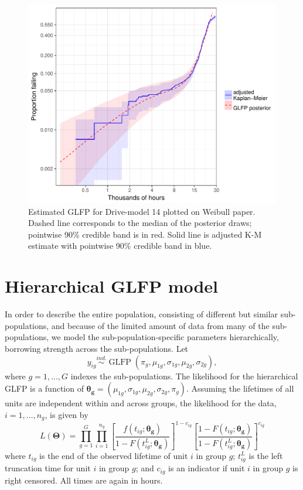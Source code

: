 \documentclass[aap]{imsart}
\newcommand{\ind}{\stackrel{ind.}{\sim}}
\newcommand{\op}{\operatorname}
\begin{document}
\begin{figure}[H]
\centering
  \includegraphics[width=.8\textwidth]{km14-prob-plus}
  \caption{Estimated GLFP for Drive-model 14 plotted on Weibull paper.  Dashed line corresponds to the median of the posterior draws; pointwise 90\% credible band is in red.  Solid line is adjusted K-M estimate with pointwise 90\% credible band in blue.}
  \label{ex1-overlay}
\end{figure}


\section{Hierarchical GLFP model}
\label{sec:Hierarchical GLFP model}

In order to describe the entire population, consisting of different but similar sub-populations, and because of the limited amount of data from many of the sub-populations, we model the sub-population-specific parameters hierarchically, borrowing strength across the sub-populations.  Let
\begin{equation}
y_{ig} \ind \op{GLFP}\left( \pi_g, \mu_{1g}, \sigma_{1g}, \mu_{2g}, \sigma_{2g} \right),
\end{equation}
where $g=1,\ldots,G$ indexes the sub-populations.  The likelihood for the hierarchical GLFP is a function of $\bm{\theta_g} = (\mu_{1g}, \sigma_{1g}, \mu_{2g}, \sigma_{2g}, \pi_{g})$.  Assuming the lifetimes of all units are independent within and across groups, the likelihood for the data, $i=1,\dots,n_g$,  is given by
\begin{equation*}
L(\bm{\Theta})= \prod_{g=1}^{G} \prod_{i=1}^{n_{g}} \left[\frac{f(t_{ig};\bm{\theta_g})}{1-F(t_{ig}^L;\bm{\theta_g})}\right]^{1-c_{ig}} \left[ \frac{1-F(t_{ig};\bm{\theta_g})}{1-F(t_{ig}^L;\bm{\theta_g})} \right]^{c_{ig}}
\end{equation*}
where $t_{ig}$ is the end of the observed lifetime of unit $i$ in group $g$; $t_{ig}^L$ is the left truncation time for unit $i$ in group $g$; and $c_{ig}$ is an indicator if unit $i$ in group $g$ is right censored.  All times are again in hours.
\end{document}
